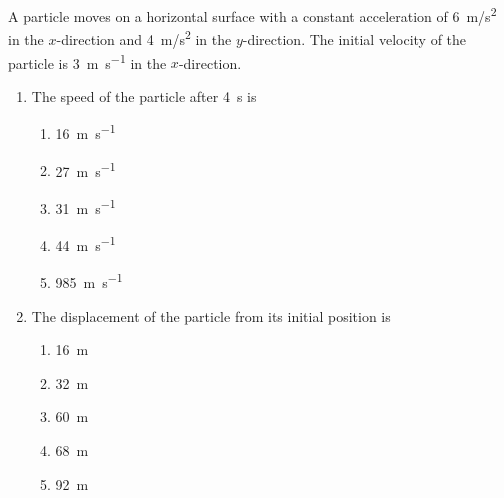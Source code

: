 \documentclass{../../../oss-apphys}
\begin{document}
\begin{multicols}{2}
  A particle moves on a horizontal surface with a constant acceleration of
  \SI{6}{m/s^2} in the $x$-direction and \SI{4}{m/s^2} in the $y$-direction. The
  initial velocity of the particle is \SI{3}{\metre\per\second} in the
  $x$-direction.
  \begin{enumerate}[resume,leftmargin=18pt]
  \item The speed of the particle after \SI{4}{\second} is
    \begin{enumerate}[nosep,leftmargin=18pt,label=(\Alph*)]
    \item\SI{16 }{\metre\per\second}
    \item\SI{27 }{\metre\per\second}
    \item\SI{31 }{\metre\per\second}
    \item\SI{44 }{\metre\per\second}
    \item\SI{985}{\metre\per\second}
    \end{enumerate}
    \label{q:particle1}
    
  \item The displacement of the particle from its initial position is
    \begin{enumerate}[nosep,leftmargin=18pt,label=(\Alph*)]
    \item\SI{16}{\metre}
    \item\SI{32}{\metre}
    \item\SI{60}{\metre}
    \item\SI{68}{\metre}
    \item\SI{92}{\metre}
    \end{enumerate}
    \label{q:particle2}
    
%
    

\end{enumerate}
\end{multicols}
\end{document}
